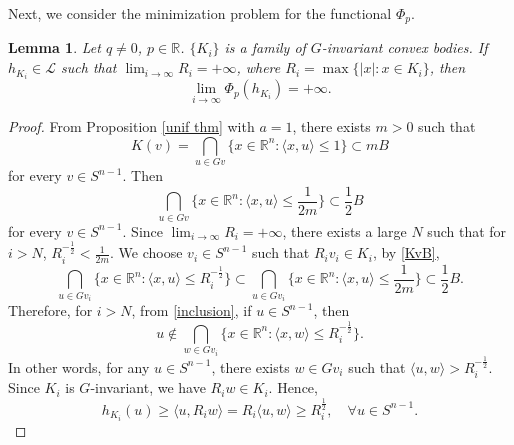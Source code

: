 \documentclass[12pt, reqno]{amsart}
\newtheorem{lemma}[theorem]{Lemma}
\theoremstyle{definition}
\theoremstyle{remark}
\numberwithin{equation}{section}
\newcommand{\R}{\mathbb{R}}
\newcommand{\Sn}{S^{n-1}}
\newcommand{\la}{\langle}
\newcommand{\ra}{\rangle}
\begin{document}
	Next, we consider the minimization problem for the functional $\Phi_{p}$.
	
	\begin{lemma}\label{unif bound}
		Let $q\neq 0$, $p\in\R$. $\{K_i\}$ is a family of $G$-invariant convex bodies. If $h_{K_{i}}\in \mathcal{L}$ such that $\lim_{i \to \infty} R_{i} = +\infty$, where  $R_{i}=\max\{|x|: x\in K_{i}\}$, then
		\begin{equation}
		\lim_{i \to \infty} \Phi_{p}(h_{K_{i}}) = +\infty.
		\end{equation}
	\end{lemma}
	
	\begin{proof}
	From Proposition \ref{unif thm} with $a=1$, there exists $m>0$ such that 
	\begin{equation*}
		K(v) = \bigcap_{u \in Gv} \{ x \in \mathbb{R}^n : \langle x, u \rangle \leq  1 \} \subset mB
	\end{equation*}
	 for every  $v \in S^{n-1}$. Then 
	 \begin{equation}\label{KvB}
	  \bigcap_{u \in Gv} \{ x \in \mathbb{R}^n : \langle x, u \rangle \leq   \frac{1}{2m} \} \subset \frac{1}{2}B
	 \end{equation}
	 for every  $v \in S^{n-1}$. Since $\lim_{i \to \infty} R_{i} = +\infty$, there exists a large $N$ such that for $i>N$, $R_{i}^{-\frac{1}{2}}< \frac{1}{2m}$. We choose $v_{i}\in\Sn$ such that $R_{i}v_{i}\in K_{i}$, by \eqref{KvB},
	 \begin{equation}\label{inclusion}
\bigcap_{u \in Gv_{i}} \{ x \in \mathbb{R}^n : \langle x, u \rangle \leq  R_{i}^{-\frac{1}{2}}  \}\subset	 	 \bigcap_{u \in Gv_{i}} \{ x \in \mathbb{R}^n : \langle x, u \rangle \leq   \frac{1}{2m} \} \subset \frac{1}{2}B.
	 \end{equation} 
	 Therefore, for $i>N$, from \eqref{inclusion}, if $u\in\Sn$, then 
	 \begin{equation*}
	 	u\notin \bigcap_{w \in Gv_{i}} \{ x \in \mathbb{R}^n : \langle x, w \rangle \leq  R_{i}^{-\frac{1}{2}}  \}.
	 \end{equation*}
	 In other words, for any $u\in\Sn$, there exists $w\in G v_{i} $ such that $\la u, w\ra>R_{i}^{-\frac{1}{2}} $. Since $K_{i}$ is $G$-invariant, we have $R_{i}w\in K_{i}$. Hence, 
	 \begin{equation}\label{sup low}
	 	h_{K_{i}}(u)\ge \la u, R_{i}w \ra=R_{i}\la u, w \ra\ge R_{i}^{\frac{1}{2}},\quad \text{$\forall u\in\Sn$}.
	 \end{equation}
	 

\end{proof}
\end{document}
